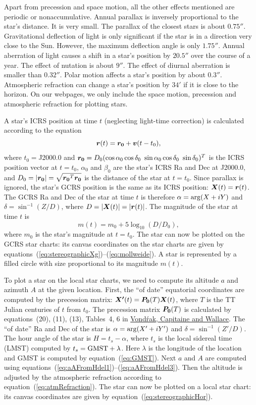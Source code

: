 \documentclass[12pt]{article}
\newcommand \beq {\begin{equation}}
\newcommand \eeq {\end{equation}}
\newcommand{\ve}[1]{\mbox{\boldmath $#1$}}
\begin{document}
Apart from precession and space motion, all the other effects mentioned 
are periodic or nonaccumulative. Annual parallax is 
inversely proportional to the star's distance. It is very small. The parallax 
of the closest stars is about $0.75''$. Gravitational deflection of light is 
only significant if the star is in a direction very close to the Sun. However, 
the maximum deflection angle is only $1.75''$. Annual aberration of light causes a shift 
in a star's position by $20.5''$ over the course of a year. The effect of 
nutation is about $9''$. The effect of diurnal aberration is smaller than $0.32''$. Polar 
motion affects a star's position by about $0.3''$. Atmospheric refraction 
can change a star's position by $34'$ if it is close to the horizon. 
On our webpages, we only include the space motion, precession and atmospheric 
refraction for plotting stars.

A star's ICRS position at time $t$ (neglecting light-time correction) 
is calculated according to the equation 
\beq
  \ve{r}(t) = \ve{r_0} + \ve{v} (t-t_0) ,
\eeq
where $t_0=$J2000.0 and $\ve{r_0} = D_0 (\cos \alpha_0 \cos \delta_0\ 
\sin \alpha_0 \cos \delta_0\ \sin \delta_0)^T$ is the ICRS position 
vector at $t=t_0$, $\alpha_0$ and $\beta_0$ are the star's ICRS Ra and Dec 
at J2000.0, and $D_0=|\ve{r_0}|=\sqrt{\ve{r_0}^T \ve{r_0}}$ is the distance 
of the star at $t=t_0$. Since parallax is ignored, the star's GCRS position 
is the same as its ICRS position: $\ve{X}(t)=\ve{r}(t)$. The GCRS Ra and Dec 
of the star at time $t$ is therefore $\alpha = {\rm arg}(X+iY)$ and 
$\delta = \sin^{-1} (Z/D)$, where $D=|\ve{X}(t)|=|\ve{r}(t)|$. The 
magnitude of the star at time $t$ is 
\beq
  m(t) = m_0 + 5\log_{10}(D/D_0) ,
\eeq
where $m_0$ is the star's magnitude at $t=t_0$. The star can now be 
plotted on the GCRS star charts: its canvas coordinates on the 
star charts are given by equations~(\ref{eq:stereographicXg})--(\ref{eq:mollweide}).  
A star is represented by a filled circle with size proportional to its 
magnitude $m(t)$.

To plot a star on the local star charts, we need to compute its altitude $a$ 
and azimuth $A$ at the given location. First, the ``of date'' equatorial 
coordinates are computed by the precession matrix: $\ve{X'}(t)=\ve{P_0}(T)\ve{X}(t)$, 
where $T$ is the TT Julian centuries of $t$ from $t_0$. The precession matrix 
$\ve{P_0}(T)$ is calculated by equations~(20), (11), (13), Tables~4, 6 in
\href{http://adsabs.harvard.edu/abs/2011A%26A...534A..22V}{Vond\'rak, Capitaine and Wallace}.
The ``of date'' Ra and Dec 
of the star is $\alpha = {\rm arg}(X'+iY')$ and $\delta=\sin^{-1} (Z'/D)$. 
The hour angle of the star is $H=t_s-\alpha$, where $t_s$ is the local 
sidereal time (LMST) computed by $t_s = {\rm GMST}+\lambda$. 
Here $\lambda$ is the longitude of the location and GMST is computed 
by equation~(\ref{eq:GMST}). Next $a$ and $A$ are computed using 
equations~(\ref{eq:aAFromHdel1})--(\ref{eq:aAFromHdel3}). Then the altitude 
is adjusted by the atmospheric refraction according to equation~(\ref{eq:atmRefraction}). 
The star can now be plotted on a local star chart: its canvas coordinates are 
given by equation~(\ref{eq:stereographicHor}).
\end{document}
